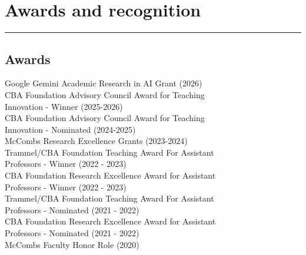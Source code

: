 \documentclass[]{deedy-resume-openfont}
\begin{document}

\section{Awards and recognition}
\vspace*{-.25cm}
\rule{\textwidth}{0.3pt}

\begin{minipage}[t]{0.5\textwidth} 
\subsection{Awards}
Google Gemini Academic Research in AI Grant (2026) \\
CBA Foundation Advisory Council Award for Teaching \\ 
\hspace*{.4cm} Innovation - Winner (2025-2026) \\
CBA Foundation Advisory Council Award for Teaching \\ 
\hspace*{.4cm} Innovation - Nominated (2024-2025) \\
McCombs Research Excellence Grants (2023-2024) \\
Trammel/CBA Foundation Teaching Award For Assistant \\
\hspace*{.4cm} Professors - Winner (2022 - 2023) \\
CBA Foundation Research Excellence Award for Assistant \\
\hspace*{.4cm} Professors - Winner (2022 - 2023) \\
Trammel/CBA Foundation Teaching Award For Assistant \\
\hspace*{.4cm} Professors - Nominated (2021 - 2022) \\
CBA Foundation Research Excellence Award for Assistant \\
\hspace*{.4cm} Professors - Nominated (2021 - 2022) \\
McCombs Faculty Honor Role (2020)



\sectionsep

\end{minipage} 
\hfill
\end{document}

